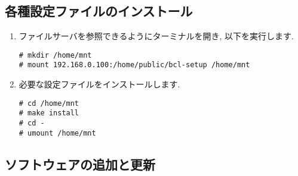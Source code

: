 \documentclass{jarticle}
\begin{document}

\subsection{各種設定ファイルのインストール\label{sec:cfg_ins}}

\begin{enumerate}
	\item ファイルサーバを参照できるようにターミナルを開き, 以下を実行します.
\begin{verbatim}
# mkdir /home/mnt
# mount 192.168.0.100:/home/public/bcl-setup /home/mnt
\end{verbatim}
	\item 必要な設定ファイルをインストールします.
\begin{verbatim}
# cd /home/mnt
# make install
# cd -
# umount /home/mnt
\end{verbatim}
\end{enumerate}

\subsection{ソフトウェアの追加と更新}
\end{document}
